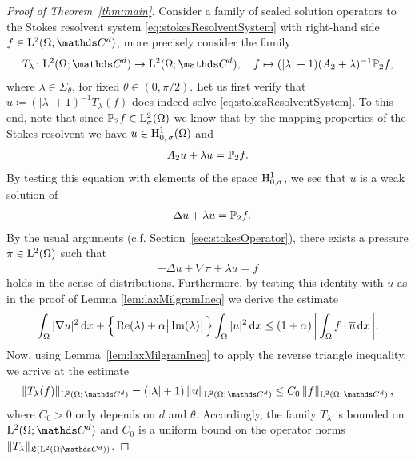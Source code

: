 \begin{proof}[Proof of Theorem~\ref{thm:main}]
  Consider a family of scaled solution operators to the Stokes resolvent system \eqref{eq:stokesResolventSystem} with right-hand side $f \in \Ell^2(\Omega; \C^d)$, more precisely consider the family
  \begin{align*}
    T_\lambda \colon \Ell^2(\Omega; \C^d) \to \Ell^2(\Omega; \C^d), \quad f \mapsto (|\lambda| + 1) (A_2 + \lambda)^{-1} \PP_2 f,
  \end{align*}
  where $\lambda \in \Sigma_\theta$, for fixed $\theta \in (0, \pi/2)$.
  Let us first verify that $u \coloneqq (|\lambda| + 1)^{-1} T_\lambda(f)$ does indeed solve \eqref{eq:stokesResolventSystem}.
  To this end, note that since $\mathbb{P}_2 f \in \mathrm{L}^2_\sigma(\Omega)$ we know that by the mapping properties of the Stokes resolvent we have $u \in \mathrm{H}^1_{0,\,\sigma}(\Omega)$ and
  \begin{align*}
    A_2 u + \lambda u = \mathbb{P}_2 f.
  \end{align*}
  By testing this equation with elements of the space $\mathrm{H}_{0, \sigma}^1$, we see that $u$ is a weak solution of 
  \begin{align*}
    -\Delta u + \lambda u = \mathbb{P}_2 f.
  \end{align*}
  By the usual arguments (c.f. Section~\ref{sec:stokesOperator}), there exists a pressure $\pi \in \mathrm{L}^2(\Omega)$ such that 
  \begin{align*}
    -\Delta u + \nabla \pi + \lambda u = f
  \end{align*}
  holds in the sense of distributions.
  Furthermore, by testing this identity with $\overline u$ as in the proof of Lemma \ref{lem:laxMilgramIneq} we derive the estimate
  \begin{align}
    \label{eq:inequalityUnderConsideration}
    \int_\Omega |\nabla u|^2 \, {\operatorname{d}\!{x}} + \Big\{ \operatorname{Re}(\lambda) + \alpha \big| \operatorname{Im}(\lambda) \big| \, \Big\} \int_\Omega |u|^2 \, {\operatorname{d}\!{x}} 
    \leq (1 + \alpha)\, \bigg| \int_\Omega f \cdot \overline u \, {\operatorname{d}\!{x}}\, \bigg|.
  \end{align} 
  Now, using Lemma~\ref{lem:laxMilgramIneq} to apply the reverse triangle inequality, we arrive at the estimate
  \begin{align*}
    \| T_\lambda(f) \|_{\Ell^2(\Omega;\, \C^d)} = (|\lambda| + 1)\, \|u\|_{\Ell^2(\Omega;\, \C^d)}
    \leq C_0 \, \|f\|_{\Ell^2(\Omega;\, \C^d)}\,,
  \end{align*}
  where $C_0 > 0$ only depends on $d$ and $\theta$.
  Accordingly, the family $T_\lambda$ is bounded on $\Ell^2(\Omega; \C^d)$ and $C_0$ is a uniform bound on the operator norms $\|T_\lambda\|_{\Li(\Ell^2(\Omega; \C^d))}$.


\end{proof}
